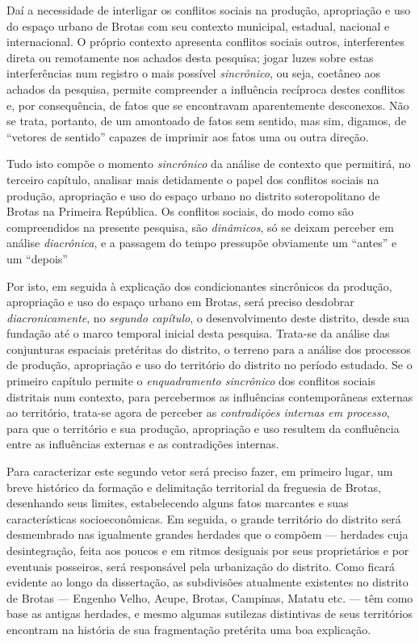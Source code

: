 Daí a necessidade de interligar os conflitos sociais na produção, apropriação e uso do espaço urbano de Brotas com seu contexto municipal, estadual, nacional e internacional. O próprio contexto apresenta conflitos sociais outros, interferentes direta ou remotamente nos achados desta pesquisa; jogar luzes sobre estas interferências num registro o mais possível \textit{sincrônico}, ou seja, coetâneo aos achados da pesquisa, permite compreender a influência recíproca destes conflitos e, por consequência, de fatos que se encontravam aparentemente desconexos. Não se trata, portanto, de um amontoado de fatos sem sentido, mas sim, digamos, de ``vetores de sentido'' capazes de imprimir aos fatos uma ou outra direção.

Tudo isto compõe o momento \textit{sincrônico} da análise de contexto que permitirá, no terceiro capítulo, analisar mais detidamente o papel dos conflitos sociais na produção, apropriação e uso do espaço urbano no distrito soteropolitano de Brotas na Primeira República. Os conflitos sociais, do modo como são compreendidos na presente pesquisa, são \textit{dinâmicos}, só se deixam perceber em análise \textit{diacrônica}, e a passagem do tempo pressupõe obviamente um ``antes'' e um ``depois''

Por isto, em seguida à explicação dos condicionantes sincrônicos da produção, apropriação e uso do espaço urbano em Brotas, será preciso desdobrar \textit{diacronicamente}, no \textit{segundo capítulo}, o desenvolvimento deste distrito, desde sua fundação até o marco temporal inicial desta pesquisa. Trata-se da análise das conjunturas espaciais pretéritas do distrito, o terreno para a análise dos processos de produção, apropriação e uso do território do distrito no período estudado. Se o primeiro capítulo permite o \textit{enquadramento sincrônico} dos conflitos sociais distritais num contexto, para percebermos as influências contemporâneas externas ao território, trata-se agora de perceber as \textit{contradições internas em processo}, para que o território e sua produção, apropriação e uso resultem da confluência entre as influências externas e as contradições internas. 

Para caracterizar este segundo vetor será preciso fazer, em primeiro lugar, um breve histórico da formação e delimitação territorial da freguesia de Brotas, desenhando seus limites, estabelecendo alguns fatos marcantes e suas características socioeconômicas. Em seguida, o grande território do distrito será desmembrado nas igualmente grandes herdades que o compõem --- herdades cuja desintegração, feita aos poucos e em ritmos desiguais por seus proprietários e por eventuais posseiros, será responsável pela urbanização do distrito. Como ficará evidente ao longo da dissertação, as subdivisões atualmente existentes no distrito de Brotas --- Engenho Velho, Acupe, Brotas, Campinas, Matatu etc. --- têm como base as antigas herdades, e mesmo algumas sutilezas distintivas de seus territórios encontram na história de sua fragmentação pretérita uma boa explicação.

